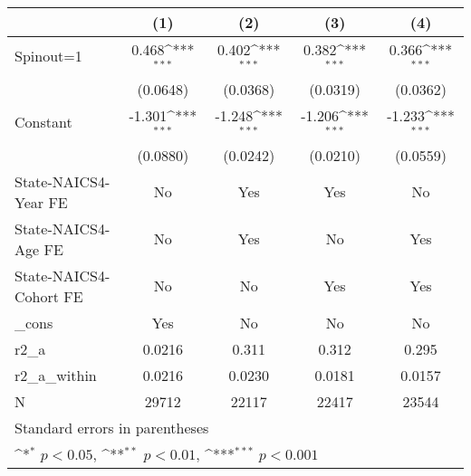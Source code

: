 {
\def\sym#1{\ifmmode^{#1}\else\(^{#1}\)\fi}
\begin{tabular}{l*{4}{c}}
\hline\hline
                    &\multicolumn{1}{c}{(1)}         &\multicolumn{1}{c}{(2)}         &\multicolumn{1}{c}{(3)}         &\multicolumn{1}{c}{(4)}         \\
\hline
Spinout=1           &       0.468\sym{***}&       0.402\sym{***}&       0.382\sym{***}&       0.366\sym{***}\\
                    &    (0.0648)         &    (0.0368)         &    (0.0319)         &    (0.0362)         \\
[1em]
Constant            &      -1.301\sym{***}&      -1.248\sym{***}&      -1.206\sym{***}&      -1.233\sym{***}\\
                    &    (0.0880)         &    (0.0242)         &    (0.0210)         &    (0.0559)         \\
[1em]
State-NAICS4-Year FE&          No         &         Yes         &         Yes         &          No         \\
[1em]
State-NAICS4-Age FE &          No         &         Yes         &          No         &         Yes         \\
[1em]
State-NAICS4-Cohort FE&          No         &          No         &         Yes         &         Yes         \\
[1em]
\_cons              &         Yes         &          No         &          No         &          No         \\
\hline
r2\_a                &      0.0216         &       0.311         &       0.312         &       0.295         \\
r2\_a\_within         &      0.0216         &      0.0230         &      0.0181         &      0.0157         \\
N                   &       29712         &       22117         &       22417         &       23544         \\
\hline\hline
\multicolumn{5}{l}{\footnotesize Standard errors in parentheses}\\
\multicolumn{5}{l}{\footnotesize \sym{*} \(p<0.05\), \sym{**} \(p<0.01\), \sym{***} \(p<0.001\)}\\
\end{tabular}
}
